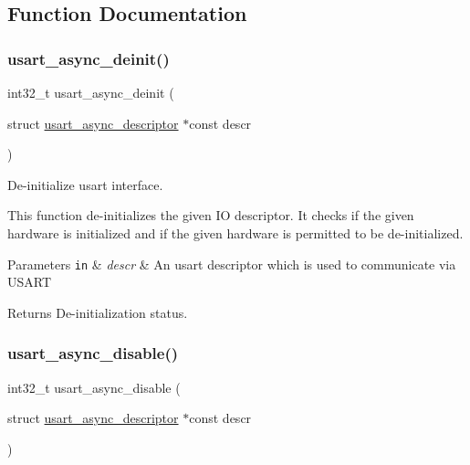 \subsection{Function Documentation}
\mbox{\label{group__doc__driver__hal__usart__async_gab7ef65ba7b4afd13cb11dcc72315ca43}} 
\subsubsection{\texorpdfstring{usart\+\_\+async\+\_\+deinit()}{usart\_async\_deinit()}}
{\footnotesize\ttfamily int32\+\_\+t usart\+\_\+async\+\_\+deinit (\begin{DoxyParamCaption}\item[{struct \hyperlink{structusart__async__descriptor}{usart\+\_\+async\+\_\+descriptor} $\ast$const}]{descr }\end{DoxyParamCaption})}



De-\/initialize usart interface. 

This function de-\/initializes the given IO descriptor. It checks if the given hardware is initialized and if the given hardware is permitted to be de-\/initialized.


\begin{DoxyParams}[1]{Parameters}
\mbox{\tt in}  & {\em descr} & An usart descriptor which is used to communicate via U\+S\+A\+RT\\
\hline
\end{DoxyParams}
\begin{DoxyReturn}{Returns}
De-\/initialization status. 
\end{DoxyReturn}
\mbox{\label{group__doc__driver__hal__usart__async_ga575b7b546a7357088530a9cebf60ad9a}} 
\subsubsection{\texorpdfstring{usart\+\_\+async\+\_\+disable()}{usart\_async\_disable()}}
{\footnotesize\ttfamily int32\+\_\+t usart\+\_\+async\+\_\+disable (\begin{DoxyParamCaption}\item[{struct \hyperlink{structusart__async__descriptor}{usart\+\_\+async\+\_\+descriptor} $\ast$const}]{descr }\end{DoxyParamCaption})}



